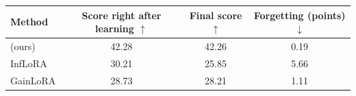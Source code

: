 \begin{tabular}{lccc}
    \toprule
    Method & \shortstack[c]{Score\\right after\\learning $\uparrow$} & \shortstack[c]{Final\\score $\uparrow$} & \shortstack[c]{Forgetting\\(points) $\downarrow$} \\
    \midrule
    \cert{} (ours) & 42.28 & 42.26 & 0.19 \\
    InfLoRA & 30.21 & 25.85 & 5.66 \\
    GainLoRA & 28.73 & 28.21 & 1.11 \\
    \bottomrule
\end{tabular}
